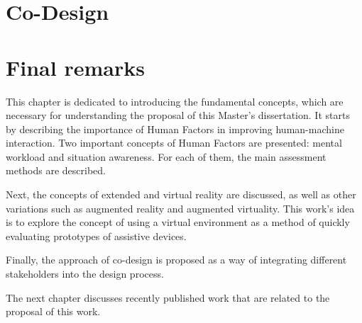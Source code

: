         

\section{Co-Design}
\label{sec:co_design}

    

\section{Final remarks}
\label{sec:final_remarks2}


This chapter is dedicated to introducing the fundamental concepts, which are necessary for understanding the proposal of this Master's dissertation. It starts by describing the importance of Human Factors in improving human-machine interaction. Two important concepts of Human Factors are presented: mental workload and situation awareness. For each of them, the main assessment methods are described.

Next, the concepts of extended and virtual reality are discussed, as well as other variations such as augmented reality and augmented virtuality. This work's idea is to explore the concept of using a virtual environment as a method of quickly evaluating prototypes of assistive devices.

Finally, the approach of co-design is proposed as a way of integrating different stakeholders into the design process. 

The next chapter discusses recently published work that are related to the proposal of this work.
